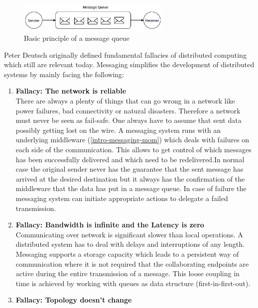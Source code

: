 \begin{figure}[H]
    \centering
    \includegraphics[width=0.65\textwidth]{images/messaging-simple.png}
    \caption{Basic principle of a message queue}
    \label{fig:messaging-simple}
\end{figure}
\newpage
Peter Deutsch originally defined fundamental fallacies of distributed computing
which still are relevant today.\cite{fallaciesOfDs} Messaging
simplifies the development of distributed systems by mainly facing the
following:

\begin{enumerate}
    \item{\textbf{Fallacy: The network is reliable} \hfill \\
        There are always a plenty of things that can go wrong in a network
       like power failures, bad connectivity or natural disasters. Therefore a
       network must never be seen as fail-safe. One always have to assume
       that sent data possibly getting lost on the wire. A messaging system
       runs with an underlying middleware (\ref{intro-messaging-mom})
       which deals with failures on each side of the communication. This allows to
       get control of which messages has been successfully delivered and which
       need to be redelivered.In normal case the original sender never has the
       guarantee that the sent message has arrived at the desired destination
       but it always has the confirmation of the middleware that the data has put in a
       message queue. In case of failure the messaging system can initiate
       appropriate actions to delegate a failed transmission.}   
    \item{\textbf{Fallacy: Bandwidth is infinite and the Latency is zero } \hfill \\
        Communicating over network is significant slower than local operations.
        A distributed system has to deal with delays and interruptions of any
        length. Messaging supports a storage capacity which leads to a
        persistent way of communication where it is not required that the
        collaborating endpoints are active during the entire transmission of a
        message. This loose coupling in time is achieved by working with queues
        as data structure (first-in-first-out).
        }
    \item{\textbf{Fallacy: Topology doesn't change} \hfill \\
}
\end{enumerate}
